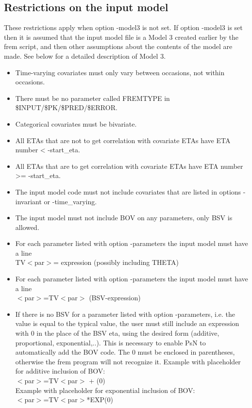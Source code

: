 \subsection{Restrictions on the input model}
These restrictions apply when option -model3 is not set. 
If option -model3 is set then it is assumed that the input model file is a Model 3 created earlier 
by the frem script, and then other assumptions about the contents of the model are made. See below for a detailed description of Model 3.
\begin{itemize}
	\item Time-varying covariates must only vary between occasions, not within occasions. 
	\item There must be no parameter called FREMTYPE in \$INPUT/\$PK/\$PRED/\$ERROR.
	\item Categorical covariates must be bivariate.
    \item All ETAs that are not to get correlation with covariate ETAs have ETA number < -start\_eta.
    \item All ETAs that are to get correlation with covariate ETAs have ETA number >= -start\_eta.
    \item The input model code must not include covariates that are listed in 
    options -invariant or -time\_varying.
    \item The input model must not include BOV on any parameters, only BSV is allowed.
    \item For each parameter listed with option -parameters the input model must have a line \\
    TV$<$par$>$= expression (possibly including THETA)
    \item For each parameter listed with option -parameters the input model must have a line \\
    $<$par$>$=TV$<$par$>$ (BSV-expression)
    \item If there is no BSV for a parameter listed with option -parameters, 
    i.e. the value is equal to the typical value, the user must still 
    include an expression with 0 in the place of the BSV eta, using the desired form (additive, proportional, exponential,..). 
    This is necessary to enable PsN to automatically add the BOV code. The 0 must be enclosed in parentheses, otherwise the 
    frem program will not recognize it. Example with placeholder for additive inclusion of BOV:\\
    $<$par$>$=TV$<$par$>$ + (0) \\
    Example with placeholder for exponential inclusion of BOV:\\
    $<$par$>$=TV$<$par$>$*EXP(0) 
\end{itemize}


